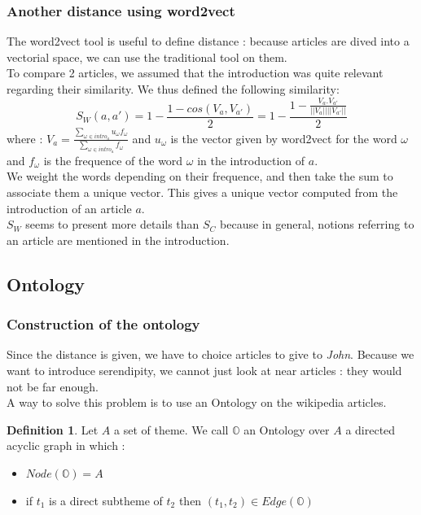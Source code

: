 \documentclass[11pt]{article}
\theoremstyle{plain}
\theoremstyle{definition}
\newtheorem{defn}{Definition}[section]
\theoremstyle{remark}
\begin{document}
\subsubsection{Another distance using word2vect}
The word2vect tool is useful to define distance : because articles are dived into a vectorial space, we can use the traditional tool on them. \\
To compare 2 articles, we assumed that the introduction was quite relevant regarding their similarity. We thus defined the following similarity:
$$S_W(a,a') = 1- \frac{1 - cos(V_a,V_{a'})}{2}= 1-\frac{1-\frac{V_a.V_{a'}}{||V_a||||V_{a'}||}}{2}$$
where : $V_a = \frac{\sum_{\omega\in intro_a}u_\omega f_\omega}{\sum_{\omega\in intro_a}f_\omega}$ and $u_\omega$ is the vector given by word2vect for the word $\omega$ and $f_\omega$ is the frequence of the word $\omega$ in the introduction of $a$.\\
We weight the words depending on their frequence, and then take the sum to associate them a unique vector. This gives a unique vector computed from the introduction of an article $a$.\\
$S_W$ seems to present more details than $S_C$ because in general, notions referring to an article are mentioned in the introduction. 


\subsection{Ontology}
\subsubsection{Construction of the ontology}
Since the distance is given, we have to choice articles to give to \textit{John}. Because we want to introduce serendipity, we cannot just look at near articles : they would not be far enough.\\ 
A way to solve this problem is to use an Ontology on the wikipedia articles.

\vspace*{5mm}
\begin{defn}
  Let $A$ a set of theme. We call $\mathbb{O}$ an Ontology over $A$ a directed acyclic graph in which :
  \begin{itemize}
  \item $ Node(\mathbb{O}) = A$
  \item if $t_1$ is a direct subtheme of $t_2$ then $(t_1,t_2) \in Edge(\mathbb{O})$
  \end{itemize}
\end{defn}
\end{document}
